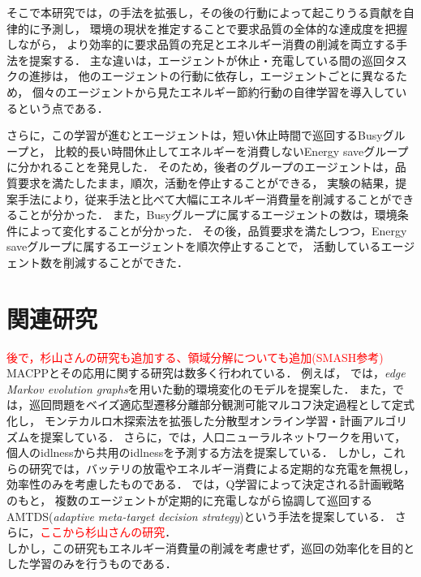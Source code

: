 \documentclass[12pt,a4j,twoside]{jarticle}
\def\red#1{\textcolor{red}{#1}}
\begin{document}
そこで本研究では，\cite{Wu2019}の手法を拡張し，その後の行動によって起こりうる貢献を自律的に予測し，
環境の現状を推定することで要求品質の全体的な達成度を把握しながら，
より効率的に要求品質の充足とエネルギー消費の削減を両立する手法を提案する．
主な違いは，エージェントが休止・充電している間の巡回タスクの進捗は，
他のエージェントの行動に依存し，エージェントごとに異なるため，
個々のエージェントから見たエネルギー節約行動の自律学習を導入しているという点である．
\par

さらに，この学習が進むとエージェントは，短い休止時間で巡回するBusyグループと，
比較的長い時間休止してエネルギーを消費しないEnergy saveグループに分かれることを発見した．
そのため，後者のグループのエージェントは，品質要求を満たしたまま，順次，活動を停止することができる，
実験の結果，提案手法により，従来手法と比べて大幅にエネルギー消費量を削減することができることが分かった．
また，Busyグループに属するエージェントの数は，環境条件によって変化することが分かった．
その後，品質要求を満たしつつ，Energy saveグループに属するエージェントを順次停止することで，
活動しているエージェント数を削減することができた．
\par

\section{関連研究}
\red{後で，杉山さんの研究も追加する、領域分解についても追加(SMASH参考)}\\
MACPPとその応用に関する研究は数多く行われている\cite{Hattori2021,Tevyashov2022,Wiandt2018,Othmani2017,Zhou2019}．
例えば， \cite{Othmani2017}では，{\em edge Markov evolution graphs}を用いた動的環境変化のモデルを提案した．
また，\cite{Zhou2019}では，巡回問題をベイズ適応型遷移分離部分観測可能マルコフ決定過程として定式化し，
モンテカルロ木探索法を拡張した分散型オンライン学習・計画アルゴリズムを提案している．
さらに，\cite{Othmani2018}では，人口ニューラルネットワークを用いて，
個人のidlnessから共用のidlnessを予測する方法を提案している．
しかし，これらの研究では，バッテリの放電やエネルギー消費による定期的な充電を無視し，
効率性のみを考慮したものである．
\cite{Yoneda2013}では，Q学習によって決定される計画戦略のもと，
複数のエージェントが定期的に充電しながら協調して巡回するAMTDS({\em adaptive meta-target decision strategy})という手法を提案している．
さらに，\red{ここから杉山さんの研究}．\\
しかし，この研究もエネルギー消費量の削減を考慮せず，巡回の効率化を目的とした学習のみを行うものである．
\par
\end{document}
